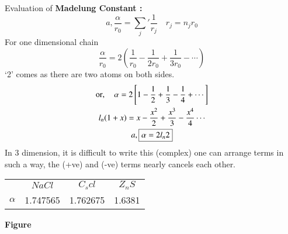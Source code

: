 Evaluation of {\bf Madelung Constant :} 
$$
a, \frac{\alpha}{r_{0}}={\sum\limits_{j}}'\frac{1}{r_{j}}\quad r_{j}=n_{j}r_{0}
$$
For one dimensional chain
$$
\dfrac{\alpha}{r_{0}}=2\left(\frac{1}{r_{0}}-\frac{1}{2r_{0}}+\frac{1}{3r_{0}}-\cdots\right)
$$
`2' comes as there are two atoms on both sides.
\begin{gather*}
\text{or},\quad \alpha=2\left[1-\frac{1}{2}+\frac{1}{3}-\frac{1}{4}+\cdots\right]\\
l_{n}(1+x)=x-\frac{x^{2}}{2}+\frac{x^{3}}{3}-\frac{x^{4}}{4}\cdots\\
a, \fbox{$\alpha=2l_{n}2$}
\end{gather*}
In 3 dimension, it is difficult to write this (complex) one can arrange terms in such a way, the (+ve) and (-ve) terms nearly cancels each other.
\begin{center}
\begin{tabular}{lccc}
 & $NaCl$ & $C_{s}cl$ & $Z_{n}S$\\
$\alpha$ & 1.747565 & 1.762675 & 1.6381
\end{tabular}
\end{center}
\begin{center}
{\bf Figure}
\end{center}

